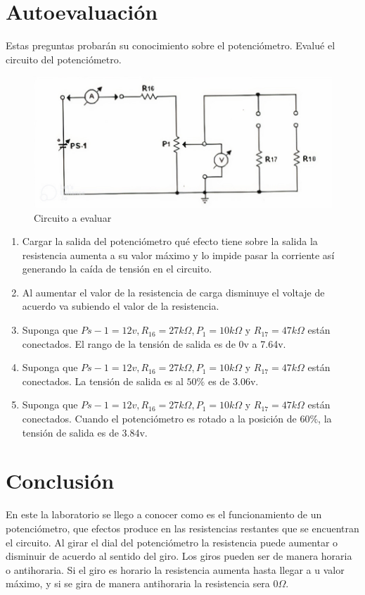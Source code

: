 \section{Autoevaluación}
Estas preguntas probarán su conocimiento sobre el potenciómetro. Evalué el circuito del potenciómetro.
\\
\begin{figure}[h]
	\centering
	\includegraphics[scale=0.3]{imagenes/2}
	\caption{Circuito a evaluar}
\end{figure}
\begin{enumerate}
	\item Cargar la salida del potenciómetro qué efecto tiene sobre la salida la resistencia aumenta a su valor máximo y lo impide pasar la corriente así generando la caída de tensión en el circuito.
	\item Al aumentar el valor de la resistencia de carga disminuye el voltaje de acuerdo va subiendo el valor de la resistencia.
	\item Suponga que $Ps-1 =12v, R_{16}= 27k\Omega, P_{1}= 10k\Omega$ y $R_{17}=47k\Omega$ están conectados. El rango de la tensión de salida es de 0v a 7.64v. 
	\item Suponga que $Ps-1 =12v, R_{16}= 27k\Omega, P_{1}= 10k\Omega$ y $R_{17}=47k\Omega$ están conectados. La tensión de salida es al $50\%$ es de 3.06v.  
	\item Suponga que $Ps-1 =12v, R_{16}= 27k\Omega, P_{1}= 10k\Omega$ y $R_{17}=47k\Omega$ están conectados. Cuando el potenciómetro es rotado a la posición de $60\%$, la tensión de salida es de 3.84v.
\end{enumerate}
\section{Conclusión}
En este la laboratorio se llego a conocer como es el funcionamiento de un potenciómetro, que efectos produce en las resistencias restantes que se encuentran el circuito. Al girar el dial del potenciómetro la resistencia puede aumentar o disminuir de acuerdo al sentido del giro. Los giros pueden ser de manera horaria o antihoraria. Si el giro es horario la resistencia aumenta hasta llegar a u valor máximo, y si se gira de manera antihoraria la resistencia sera $0\Omega$.